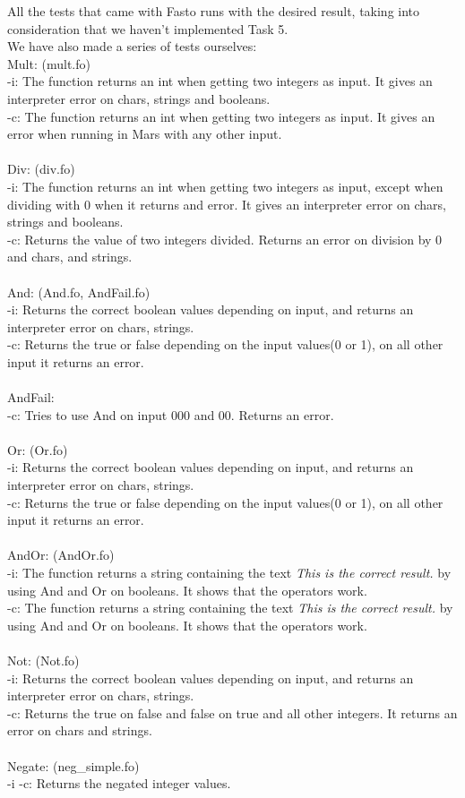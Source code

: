 \documentclass{article}
\begin{document}
All the tests that came with Fasto runs with the desired result, taking into consideration that we haven't implemented Task 5.\\
We have also made a series of tests ourselves:
\\
Mult: (mult.fo)\\
-i: The function returns an int when getting two integers as input. It gives an interpreter error on chars, strings and booleans.\\
-c: The function returns an int when getting two integers as input. It gives an error when running in Mars with any other input.\\
\\
Div: (div.fo)\\
-i: The function returns an int when getting two integers as input, except when dividing with 0 when it returns and error. It gives an interpreter error on chars, strings and booleans.\\
-c: Returns the value of two integers divided. Returns an error on division by 0 and chars, and strings.\\
\\
And: (And.fo, AndFail.fo)\\
-i: Returns the correct boolean values depending on input, and returns an interpreter error on chars, strings.\\
-c: Returns the true or false depending on the input values(0 or 1), on all other input it returns an error.\\
\\
AndFail:\\
-c: Tries to use And on input 000 and 00. Returns an error.\\
\\
Or: (Or.fo)\\
-i: Returns the correct boolean values depending on input, and returns an interpreter error on chars, strings.\\
-c: Returns the true or false depending on the input values(0 or 1), on all other input it returns an error.\\
\\
AndOr: (AndOr.fo)\\
-i: The function returns a string containing the text \textit{This is the correct result.} by using And and Or on booleans. It shows that the operators work.\\
-c: The function returns a string containing the text \textit{This is the correct result.} by using And and Or on booleans. It shows that the operators work.\\
\\
Not: (Not.fo)\\
-i: Returns the correct boolean values depending on input, and returns an interpreter error on chars, strings.\\
-c: Returns the true on false and false on true and all other integers. It returns an error on chars and strings.\\
\\
Negate: (neg\_simple.fo)\\
-i -c: Returns the negated integer values.\\
\end{document}
